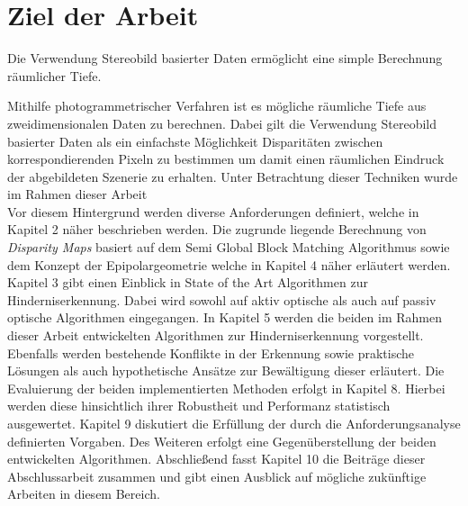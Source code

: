 \section{Ziel der Arbeit}
\label{sec:ziel_der_arbeit}
Die Verwendung Stereobild basierter Daten ermöglicht eine simple Berechnung räumlicher Tiefe.

Mithilfe photogrammetrischer Verfahren ist es mögliche räumliche Tiefe aus zweidimensionalen Daten zu berechnen. Dabei gilt die Verwendung Stereobild basierter Daten als ein einfachste Möglichkeit Disparitäten zwischen korrespondierenden Pixeln zu bestimmen um damit einen räumlichen Eindruck der abgebildeten Szenerie zu erhalten. Unter Betrachtung dieser Techniken wurde im Rahmen dieser Arbeit \\

\noindent
Vor diesem Hintergrund werden diverse Anforderungen definiert, welche in Kapitel 2 näher beschrieben werden. Die zugrunde liegende Berechnung von \emph{Disparity Maps} basiert auf dem Semi Global Block Matching Algorithmus \cite{hirschmuller2005sgm} sowie dem Konzept der Epipolargeometrie welche in Kapitel 4 näher erläutert werden. Kapitel 3 gibt einen Einblick in State of the Art Algorithmen zur Hinderniserkennung. Dabei wird sowohl auf aktiv optische als auch auf passiv optische Algorithmen eingegangen. In Kapitel 5 werden die beiden im Rahmen dieser Arbeit entwickelten Algorithmen zur Hinderniserkennung vorgestellt. Ebenfalls werden bestehende Konflikte in der Erkennung sowie praktische Lösungen als auch hypothetische Ansätze zur Bewältigung dieser erläutert. Die Evaluierung der beiden implementierten Methoden erfolgt in Kapitel 8. Hierbei werden diese hinsichtlich ihrer Robustheit und Performanz statistisch ausgewertet. Kapitel 9 diskutiert die Erfüllung der durch die Anforderungsanalyse definierten Vorgaben. Des Weiteren erfolgt eine Gegenüberstellung der beiden entwickelten Algorithmen. Abschließend fasst Kapitel 10 die Beiträge dieser Abschlussarbeit zusammen und gibt einen Ausblick auf mögliche zukünftige Arbeiten in diesem Bereich.